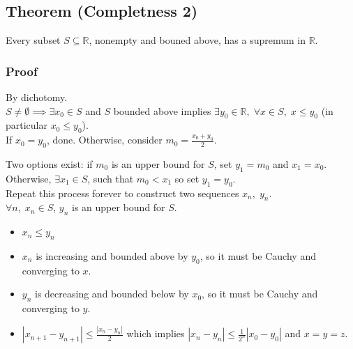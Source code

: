 \documentclass[11pt]{article}
\newcommand{\0}{\emptyset}
\newcommand{\R}{\mathbb{R}}
\begin{document}
\subsection*{Theorem (Completness 2)}
\label{sec:org9679595}
Every subset \(S\subseteq\R\), nonempty and bouned above, has a supremum in \(\R\).\\[0pt]
\subsubsection*{Proof}
\label{sec:org273746b}
By dichotomy.\\[0pt]
\(S\neq\0\implies\exists x_{0}\in S\) and \(S\) bounded above implies \(\exists y_{0}\in\R,\;\forall x\in S,\;x\leq y_{0}\) (in particular \(x_{0}\leq y_{0}\)).\\[0pt]
If \(x_{0}=y_{0}\), done. Otherwise, consider \(m_{0}=\frac{x_{0}+y_{0}}{2}\).\\[0pt]
Two options exist: if \(m_{0}\) is an upper bound for \(S\), set \(y_{1}=m_{0}\) and \(x_{1}=x_{0}\).\\[0pt]
Otherwise, \(\exists x_{1}\in S\), such that \(m_{0}<x_{1}\) so set \(y_{1}=y_{0}\).\\[0pt]
Repeat this process forever to construct two sequences \(x_{n},\;y_{n}\).\\[0pt]
\(\forall n,\;x_{n}\in S\), \(y_{n}\) is an upper bound for \(S\).\\[0pt]
\begin{itemize}
\item \(x_{n}\leq y_{n}\)\\[0pt]
\item \(x_{n}\) is increasing and bounded above by \(y_{0}\), so it must be Cauchy and converging to \(x\).\\[0pt]
\item \(y_{n}\) is decreasing and bounded below by \(x_{0}\), so it must be Cauchy and converging to \(y\).\\[0pt]
\item \(|x_{n+1}-y_{n+1}|\leq\frac{|x_{n}-y_{n}|}{2}\) which implies \(|x_{n}-y_{n}|\leq\frac{1}{2^{n}}|x_{0}-y_{0}|\) and \(x=y=z\).\\[0pt]
\end{itemize}
\end{document}
